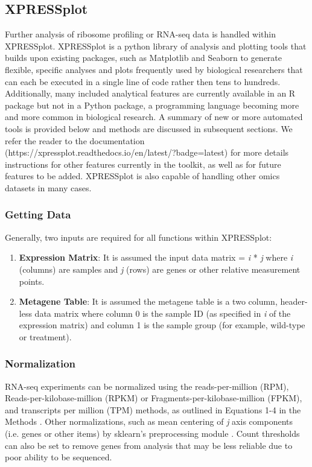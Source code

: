 \documentclass[11pt, a4paper, oneside]{article}
\begin{document}
\subsection{XPRESSplot}
Further analysis of ribosome profiling or RNA-seq data is handled within XPRESSplot. XPRESSplot is a python library of analysis and plotting tools that builds upon existing packages, such as Matplotlib \cite{matplotlib} and Seaborn \cite{seaborn} to generate flexible, specific analyses and plots frequently used by biological researchers that can each be executed in a single line of code rather then tens to hundreds. Additionally, many included analytical features are currently available in an R package but not in a Python package, a programming language becoming more and more common in biological research. A summary of new or more automated tools is provided below and methods are discussed in subsequent sections. We refer the reader to the documentation (https://xpressplot.readthedocs.io/en/latest/?badge=latest) for more details instructions for other features currently in the toolkit, as well as for future features to be added. XPRESSplot is also capable of handling other omics datasets in many cases.

\subsubsection{Getting Data}
Generally, two inputs are required for all functions within XPRESSplot:

\begin{enumerate}
  \item \textbf{Expression Matrix}: It is assumed the input data matrix = \textit{i} * \textit{j} where \textit{i} (columns) are samples and \textit{j} (rows) are genes or other relative measurement points.
  \item \textbf{Metagene Table}: It is assumed the metagene table is a two column, header-less data matrix where column 0 is the sample ID (as specified in \textit{i} of the expression matrix) and column 1 is the sample group (for example, wild-type or treatment).
\end{enumerate}

\subsubsection{Normalization}
RNA-seq experiments can be normalized using the reads-per-million (RPM), Reads-per-kilobase-million (RPKM) or Fragments-per-kilobase-million (FPKM), and transcripts per million (TPM) methods, as outlined in Equations 1-4 in the Methods \cite{evans_briefbio}. Other normalizations, such as mean centering of \textit{j} axis components (i.e. genes or other items) by sklearn's preprocessing module \cite{scikit_learn}. Count thresholds can also be set to remove genes from analysis that may be less reliable due to poor ability to be sequenced.
\end{document}
